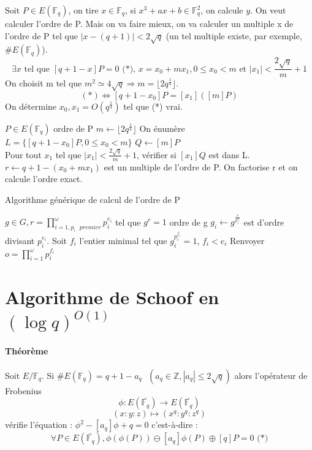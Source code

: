 \documentclass[12pt,a4paper]{report}
\begin{document}
Soit $P \in E(\mathbb{F}_q)$, on tire $ x \in \mathbb{F}_q$, si $ x^3+ax+b \in \mathbb{F}_q^2$, on calcule $y$. On veut calculer l'ordre de P. Mais on va faire mieux, on va calculer un multiple x de l'ordre de P tel que $ |x-(q+1)| < 2\sqrt{q} $ (un tel multiple existe, par exemple, $\# E(\mathbb{F}_q) $).
$$ \exists x \mbox{ tel que } [q+1-x]P = 0 \mbox{ (*), } x=x_0+mx_1, 0 \leqslant x_0 <m \mbox{ et } |x_1| < \frac{2\sqrt{q}}{m}+1$$
On choisit m tel que $ m^2 \simeq 4\sqrt{q} \Rightarrow m=\lfloor 2q^{\frac{1}{4}} \rfloor $.
$$ (*) \Leftrightarrow [q+1-x_0]P=[x_1]([m]P)$$
On détermine $x_0,x_1 = O(q^{\frac{1}{4}}) $ tel que (*) vrai.
\begin{algorithm}
\caption{}
\begin{algorithmic}[1]
\REQUIRE $P \in E(\mathbb{F}_q)$
\ENSURE ordre de P
\STATE $ m \leftarrow \lfloor 2q^{\frac{1}{4}} \rfloor $
\STATE On énumère $ L = \{[q+1-x_0]P, 0 \leqslant x_0 < m\} $
\STATE $Q \leftarrow [m]P $\\
Pour tout $x_1$ tel que $ |x_1| < \frac{2\sqrt{q}}{m}+1$, vérifier si $ [x_1]Q $ est dans L.
\STATE $ r \leftarrow q+1 - (x_0 + mx_1) $ est un multiple de l'ordre de P. On factorise r et on calcule l'ordre exact.
\end{algorithmic}
\end{algorithm}

\begin{algorithm}
\caption{Algorithme générique de calcul de l'ordre de P}
\begin{algorithmic}[1]
\REQUIRE $\displaystyle g \in G, r = \prod_{i=1,p_i \mbox{ }premier}^{\omega}p_i^{e_i}$ tel que $ g^r =1$
\ENSURE ordre de g
\STATE $g_i \leftarrow g^{\frac{r}{p_i^{e_i}}}$ est d'ordre divisant $p_i^{e_i}$.
\STATE Soit $f_i$ l'entier minimal tel que $ g_i^{p_i^{f_i}} = 1$, $ f_i < e_i$
\ENDFOR
\STATE Renvoyer $ o =\displaystyle \prod_{i=1}^{\omega} p_i^{f_i} $
\end{algorithmic}
\end{algorithm}
\section{Algorithme de Schoof en $(\log q)^{O(1)}$}
\paragraph{Théorème}
Soit $ E / \mathbb{F}_q$. Si $\# E(\mathbb{F}_q) = q+1-a_q \mbox{ } (a_q \in \mathbb{Z},|a_q| \leqslant 2\sqrt{q})$ alors l'opérateur de Frobenius $$ \phi : E(\bar{\mathbb{F}_q}) \longrightarrow E(\bar{\mathbb{F}_q})$$
$$ (x:y:z) \longmapsto (x^q:y^q:z^q) $$
vérifie l'équation : $ \phi^2-[a_q]\phi+q=0$ c'est-à-dire :
$$ \forall P \in E(\bar{\mathbb{F}_q}), \phi(\phi(P)) \ominus [a_q]\phi(P) \oplus [q]P = 0 \mbox{ (*)} $$
\end{document}
